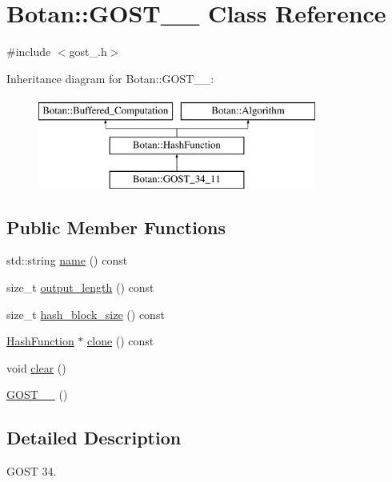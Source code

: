 \hypertarget{classBotan_1_1GOST__34__11}{\section{Botan\-:\-:G\-O\-S\-T\-\_\-\_ Class Reference}
\label{classBotan_1_1GOST__34__11}
}


{\ttfamily \#include $<$gost\-\_.\-h$>$}

Inheritance diagram for Botan\-:\-:G\-O\-S\-T\-\_\-\_\-:\begin{figure}[H]
\begin{center}
\leavevmode
\includegraphics[height=3.000000cm]{classBotan_1_1GOST__34__11}
\end{center}
\end{figure}
\subsection*{Public Member Functions}
\begin{DoxyCompactItemize}
\item 
std\-::string \hyperlink{classBotan_1_1GOST__34__11_aa87f9f7f5d493a0c9ef18fa458e281b9}{name} () const 
\item 
size\-\_\-t \hyperlink{classBotan_1_1GOST__34__11_a7c9e0be69e2252d0523d927c5f3411d1}{output\-\_\-length} () const 
\item 
size\-\_\-t \hyperlink{classBotan_1_1GOST__34__11_a7af3ecbfd4cbc4580554c46353b31cce}{hash\-\_\-block\-\_\-size} () const 
\item 
\hyperlink{classBotan_1_1HashFunction}{Hash\-Function} $\ast$ \hyperlink{classBotan_1_1GOST__34__11_a7981811e04d494fbba91f862b04d3112}{clone} () const 
\item 
void \hyperlink{classBotan_1_1GOST__34__11_a89aec48e9067757114a3a17cd3e5668d}{clear} ()
\item 
\hyperlink{classBotan_1_1GOST__34__11_a2c81857ccbdcf8e15cdf459494b110fe}{G\-O\-S\-T\-\_\-\_} ()
\end{DoxyCompactItemize}


\subsection{Detailed Description}
G\-O\-S\-T 34. 

